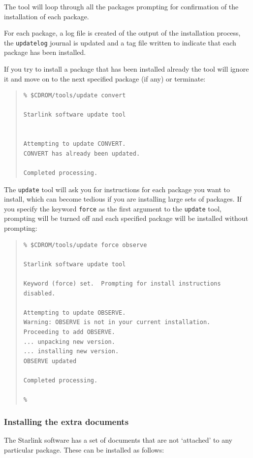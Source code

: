 \documentclass[twoside,11pt]{article}
\renewcommand{\_}{\texttt{\symbol{95}}}
\begin{document}
The tool will loop through all the packages prompting for confirmation of
the installation of each package.

For each package, a log file is created of the output of the installation
process, the \texttt{update\_log} journal is updated and a tag file
written to indicate that each package has been installed.

If you try to install a package that has been installed already the
tool will ignore it and move on to the next specified package (if any) or
terminate:

\begin{quote}
\begin{verbatim}
% $CDROM/tools/update convert

Starlink software update tool


Attempting to update CONVERT.
CONVERT has already been updated.

Completed processing.
\end{verbatim}
\end{quote}

The \texttt{update} tool will ask you for instructions for each package
you want to install, which can become tedious if you are installing large
sets of packages.  If you specify the keyword \texttt{force} as the first
argument to the \texttt{update} tool, prompting will be turned off and
each specified package will be installed without prompting:

\begin{quote}
\begin{verbatim}
% $CDROM/tools/update force observe

Starlink software update tool

Keyword (force) set.  Prompting for install instructions disabled.

Attempting to update OBSERVE.
Warning: OBSERVE is not in your current installation.
Proceeding to add OBSERVE.
... unpacking new version.
... installing new version.
OBSERVE updated

Completed processing.

%
\end{verbatim}
\end{quote}

\subsubsection{Installing the extra documents}

The Starlink software has a set of documents that are not `attached' to
any particular package.  These can be installed as follows:
\end{document}
